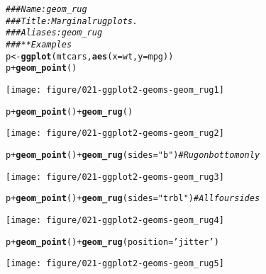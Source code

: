 \documentclass[a4paper,titlepage]{tufte-handout}\usepackage[]{graphicx}\usepackage[]{color}
\makeatletter
\def\maxwidth{ %
  \ifdim\Gin@nat@width>\linewidth
    \linewidth
  \else
    \Gin@nat@width
  \fi
}
\newcommand{\hlstr}[1]{\textcolor[rgb]{0.192,0.494,0.8}{#1}}%
\newcommand{\hlcom}[1]{\textcolor[rgb]{0.678,0.584,0.686}{\textit{#1}}}%
\newcommand{\hlopt}[1]{\textcolor[rgb]{0,0,0}{#1}}%
\newcommand{\hlstd}[1]{\textcolor[rgb]{0.345,0.345,0.345}{#1}}%
\newcommand{\hlkwb}[1]{\textcolor[rgb]{0.69,0.353,0.396}{#1}}%
\newcommand{\hlkwc}[1]{\textcolor[rgb]{0.333,0.667,0.333}{#1}}%
\newcommand{\hlkwd}[1]{\textcolor[rgb]{0.737,0.353,0.396}{\textbf{#1}}}%
\newenvironment{kframe}{%
 \def\at@end@of@kframe{}%
 \ifinner\ifhmode%
  \def\at@end@of@kframe{\end{minipage}}%
  \begin{minipage}{\columnwidth}%
 \fi\fi%
 \def\FrameCommand##1{\hskip\@totalleftmargin \hskip-\fboxsep
 \colorbox{shadecolor}{##1}\hskip-\fboxsep
     \hskip-\linewidth \hskip-\@totalleftmargin \hskip\columnwidth}%
 \MakeFramed {\advance\hsize-\width
   \@totalleftmargin\z@ \linewidth\hsize
   \@setminipage}}%
 {\par\unskip\endMakeFramed%
 \at@end@of@kframe}
\newenvironment{knitrout}{}{} %
\makeatother
\begin{document}
\begin{knitrout}
\color{fgcolor}\begin{kframe}
\begin{alltt}
\hlcom{### Name: geom_rug}
\hlcom{### Title: Marginal rug plots.}
\hlcom{### Aliases: geom_rug}
\hlcom{### ** Examples}
\hlstd{p} \hlkwb{<-} \hlkwd{ggplot}\hlstd{(mtcars,} \hlkwd{aes}\hlstd{(}\hlkwc{x}\hlstd{=wt,} \hlkwc{y}\hlstd{=mpg))}
\hlstd{p} \hlopt{+} \hlkwd{geom_point}\hlstd{()}
\end{alltt}
\end{kframe}
\texttt{[image: figure/021-ggplot2-geoms-geom\_rug1]} 
\begin{kframe}\begin{alltt}
\hlstd{p} \hlopt{+} \hlkwd{geom_point}\hlstd{()} \hlopt{+} \hlkwd{geom_rug}\hlstd{()}
\end{alltt}
\end{kframe}
\texttt{[image: figure/021-ggplot2-geoms-geom\_rug2]} 
\begin{kframe}\begin{alltt}
\hlstd{p} \hlopt{+} \hlkwd{geom_point}\hlstd{()} \hlopt{+} \hlkwd{geom_rug}\hlstd{(}\hlkwc{sides}\hlstd{=}\hlstr{"b"}\hlstd{)}    \hlcom{# Rug on bottom only}
\end{alltt}
\end{kframe}
\texttt{[image: figure/021-ggplot2-geoms-geom\_rug3]} 
\begin{kframe}\begin{alltt}
\hlstd{p} \hlopt{+} \hlkwd{geom_point}\hlstd{()} \hlopt{+} \hlkwd{geom_rug}\hlstd{(}\hlkwc{sides}\hlstd{=}\hlstr{"trbl"}\hlstd{)} \hlcom{# All four sides}
\end{alltt}
\end{kframe}
\texttt{[image: figure/021-ggplot2-geoms-geom\_rug4]} 
\begin{kframe}\begin{alltt}
\hlstd{p} \hlopt{+} \hlkwd{geom_point}\hlstd{()} \hlopt{+} \hlkwd{geom_rug}\hlstd{(}\hlkwc{position}\hlstd{=}\hlstr{'jitter'}\hlstd{)}
\end{alltt}
\end{kframe}
\texttt{[image: figure/021-ggplot2-geoms-geom\_rug5]} 
\begin{kframe}\begin{alltt}


\end{alltt}
\end{kframe}
\end{knitrout}
\end{document}
